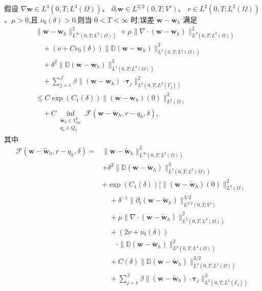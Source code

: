 \begin{theorem}[自然正则性下的一致有限元误差估计]
\label{thm:smagorinsky-fem-error-estimate-standard}
假设
$\nabla\bm{w}\in L^3(0,T;L^3(\Omega))$、
$\partial_t\bm{w}\in L^{3/2}(0,T;V')$、
$r\in L^2(0,T;L^2(\Omega))$、$\mu>0$,且 $\nu_0(\delta)>0$.则当
$0<T<\infty$ 时,误差 $\bm{w}-\bm{w}_h$ 满足
\[
\begin{aligned}
&\|\bm{w}-\bm{w}_h\|_{L^\infty(0,T;L^2(\Omega))}^2
 +\mu\|\nabla\cdot(\bm{w}-\bm{w}_h)\|_{L^2(0,T;L^2(\Omega))}^2\\
&\quad+(\nu+C\nu_0(\delta))
       \|\mathbb{D}(\bm{w}-\bm{w}_h)\|_{L^2(0,T;L^2(\Omega))}^2\\
&\quad+\delta^2
       \|\mathbb{D}(\bm{w}-\bm{w}_h)\|_{L^3(0,T;L^3(\Omega))}^3\\
&\quad+\sum_{j=1}^J\beta
       \|(\bm{w}-\bm{w}_h)\cdot\symbf{\tau}_j\|
          _{L^2(0,T;L^2(\Gamma_j))}^2\\
&\le C\exp(C_1(\delta))
       \|(\bm{w}-\bm{w}_h)(0)\|_{L^2(\Omega)}^2\\
&\quad+C\inf_{\substack{\widetilde{\bm{w}}_h\in V_{\mathrm{div}}^h\\
                          q_h\in Q_h}}
       \mathcal{F}(\bm{w}-\widetilde{\bm{w}}_h,r-q_h,\delta),
\end{aligned}
\]
其中
\[
\begin{aligned}
\mathcal{F}(\bm{w}-\widetilde{\bm{w}}_h,r-q_h,\delta)
={}&\|\bm{w}-\widetilde{\bm{w}}_h\|_{L^\infty(0,T;L^2(\Omega))}^2\\
&+\delta^2\|\mathbb{D}(\bm{w}-\widetilde{\bm{w}}_h)
       \|_{L^3(0,T;L^3(\Omega))}^3\\
&+\exp(C_1(\delta))\Biggl[
       \|(\bm{w}-\widetilde{\bm{w}}_h)(0)\|_{L^2(\Omega)}^2\\
&\quad+\delta^{-1}\|\partial_t(\bm{w}-\widetilde{\bm{w}}_h)
       \|_{L^{3/2}(0,T;V')}^{3/2}\\
&\quad+\mu\|\nabla\cdot(\bm{w}-\widetilde{\bm{w}}_h)
       \|_{L^2(0,T;L^2(\Omega))}^2\\
&\quad+(2\nu+\nu_0(\delta))\\
&\qquad\cdot\|\mathbb{D}(\bm{w}-\widetilde{\bm{w}}_h)
       \|_{L^2(0,T;L^2(\Omega))}^2\\
&\quad+C(\delta)
       \|\mathbb{D}(\bm{w}-\widetilde{\bm{w}}_h)
       \|_{L^3(0,T;L^3(\Omega))}^{3/2}\\
&\quad+\sum_{j=1}^J\beta
       \|(\bm{w}-\widetilde{\bm{w}}_h)\cdot\symbf{\tau}_j
       \|_{L^2(0,T;L^2(\Gamma_j))}^2\\

\end{aligned}\]
\end{theorem}
